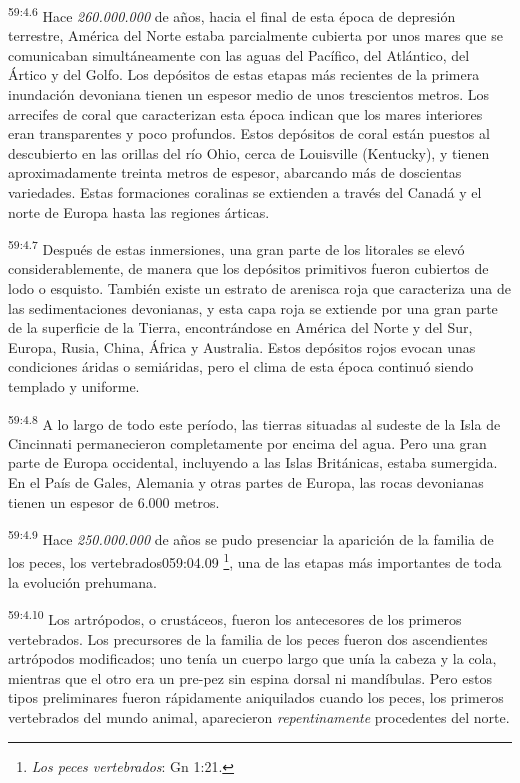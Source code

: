 \par
\textsuperscript{59:4.6} Hace \textit{260.000.000} de años, hacia el final de esta época de depresión terrestre, América del Norte estaba parcialmente cubierta por unos mares que se comunicaban simultáneamente con las aguas del Pacífico, del Atlántico, del Ártico y del Golfo. Los depósitos de estas etapas más recientes de la primera inundación devoniana tienen un espesor medio de unos trescientos metros. Los arrecifes de coral que caracterizan esta época indican que los mares interiores eran transparentes y poco profundos. Estos depósitos de coral están puestos al descubierto en las orillas del río Ohio, cerca de Louisville (Kentucky), y tienen aproximadamente treinta metros de espesor, abarcando más de doscientas variedades. Estas formaciones coralinas se extienden a través del Canadá y el norte de Europa hasta las regiones árticas.

\par
\textsuperscript{59:4.7} Después de estas inmersiones, una gran parte de los litorales se elevó considerablemente, de manera que los depósitos primitivos fueron cubiertos de lodo o esquisto. También existe un estrato de arenisca roja que caracteriza una de las sedimentaciones devonianas, y esta capa roja se extiende por una gran parte de la superficie de la Tierra, encontrándose en América del Norte y del Sur, Europa, Rusia, China, África y Australia. Estos depósitos rojos evocan unas condiciones áridas o semiáridas, pero el clima de esta época continuó siendo templado y uniforme.

\par
\textsuperscript{59:4.8} A lo largo de todo este período, las tierras situadas al sudeste de la Isla de Cincinnati permanecieron completamente por encima del agua. Pero una gran parte de Europa occidental, incluyendo a las Islas Británicas, estaba sumergida. En el País de Gales, Alemania y otras partes de Europa, las rocas devonianas tienen un espesor de 6.000 metros.

\par
\textsuperscript{59:4.9} Hace \textit{250.000.000} de años se pudo presenciar la aparición de la familia de los peces, los vertebrados059:04.09 \footnote{\textit{Los peces vertebrados}: Gn 1:21.}, una de las etapas más importantes de toda la evolución prehumana.

\par
\textsuperscript{59:4.10} Los artrópodos, o crustáceos, fueron los antecesores de los primeros vertebrados. Los precursores de la familia de los peces fueron dos ascendientes artrópodos modificados; uno tenía un cuerpo largo que unía la cabeza y la cola, mientras que el otro era un pre-pez sin espina dorsal ni mandíbulas. Pero estos tipos preliminares fueron rápidamente aniquilados cuando los peces, los primeros vertebrados del mundo animal, aparecieron \textit{repentinamente} procedentes del norte.


